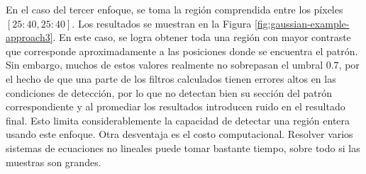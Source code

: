 En el caso del tercer enfoque, se toma la región comprendida entre los píxeles $[25:40,25:40]$. Los resultados 
se muestran en la Figura \ref{fig:gaussian-example-approach3}. En este caso, se logra obtener toda una región con mayor 
contraste que corresponde aproximadamente a las posiciones donde se encuentra el patrón. 
Sin embargo, muchos de estos valores realmente no sobrepasan el umbral $0.7$,
por el hecho de que una parte de los filtros calculados tienen errores altos en las condiciones de detección, 
por lo que no detectan bien su sección del patrón correspondiente y al promediar los resultados introducen 
ruido en el resultado final.
Esto limita considerablemente la capacidad de detectar una región entera usando este enfoque. Otra desventaja es el costo
computacional. Resolver varios sistemas de ecuaciones no lineales puede tomar bastante tiempo, sobre todo si las 
muestras son grandes.

